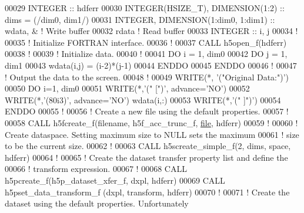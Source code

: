 \begin{DoxyCode}
00029   \textcolor{keywordtype}{INTEGER}         :: hdferr
00030   \textcolor{keywordtype}{INTEGER(HSIZE\_T)}, \textcolor{keywordtype}{DIMENSION(1:2)} :: dims = (/dim0, dim1/)
00031   \textcolor{keywordtype}{INTEGER}, \textcolor{keywordtype}{DIMENSION(1:dim0, 1:dim1)} :: wdata, & \textcolor{comment}{! Write buffer }
00032                                         rdata    \textcolor{comment}{! Read buffer}
00033   \textcolor{keywordtype}{INTEGER} :: i, j
00034   \textcolor{comment}{!}
00035   \textcolor{comment}{! Initialize FORTRAN interface.}
00036   \textcolor{comment}{!}
00037   \textcolor{keyword}{CALL }h5open\_f(hdferr)
00038   \textcolor{comment}{!}
00039   \textcolor{comment}{! Initialize data.}
00040   \textcolor{comment}{!}
00041   \textcolor{keywordflow}{DO} i = 1, dim0
00042      \textcolor{keywordflow}{DO} j = 1, dim1
00043         wdata(i,j) = (i-2)*(j-1)
00044 \textcolor{keywordflow}{     ENDDO}
00045 \textcolor{keywordflow}{  ENDDO}
00046   \textcolor{comment}{!}
00047   \textcolor{comment}{! Output the data to the screen.}
00048   \textcolor{comment}{!}
00049   \textcolor{keyword}{WRITE}(*, \textcolor{stringliteral}{'("Original Data:")'})
00050   \textcolor{keywordflow}{DO} i=1, dim0
00051      \textcolor{keyword}{WRITE}(*,\textcolor{stringliteral}{'(" [")'}, advance=\textcolor{stringliteral}{'NO'})
00052      \textcolor{keyword}{WRITE}(*,\textcolor{stringliteral}{'(80i3)'}, advance=\textcolor{stringliteral}{'NO'}) wdata(i,:)
00053      \textcolor{keyword}{WRITE}(*,\textcolor{stringliteral}{'(" ]")'})
00054 \textcolor{keywordflow}{  ENDDO}
00055   \textcolor{comment}{!}
00056   \textcolor{comment}{! Create a new file using the default properties.}
00057   \textcolor{comment}{!}
00058   \textcolor{keyword}{CALL }h5fcreate\_f(filename, h5f\_acc\_trunc\_f, \hyperlink{structfile}{file}, hdferr)
00059   \textcolor{comment}{!}
00060   \textcolor{comment}{! Create dataspace.  Setting maximum size to NULL sets the maximum}
00061   \textcolor{comment}{! size to be the current size.}
00062   \textcolor{comment}{!}
00063   \textcolor{keyword}{CALL }h5screate\_simple\_f(2, dims, space, hdferr)
00064   \textcolor{comment}{!}
00065   \textcolor{comment}{! Create the dataset transfer property list and define the}
00066   \textcolor{comment}{! transform expression.}
00067   \textcolor{comment}{!}
00068   \textcolor{keyword}{CALL }h5pcreate\_f(h5p\_dataset\_xfer\_f, dxpl, hdferr)
00069   \textcolor{keyword}{CALL }h5pset\_data\_transform\_f (dxpl, transform, hdferr)
00070   \textcolor{comment}{!}
00071   \textcolor{comment}{! Create the dataset using the default properties.  Unfortunately}

\end{DoxyCode}
